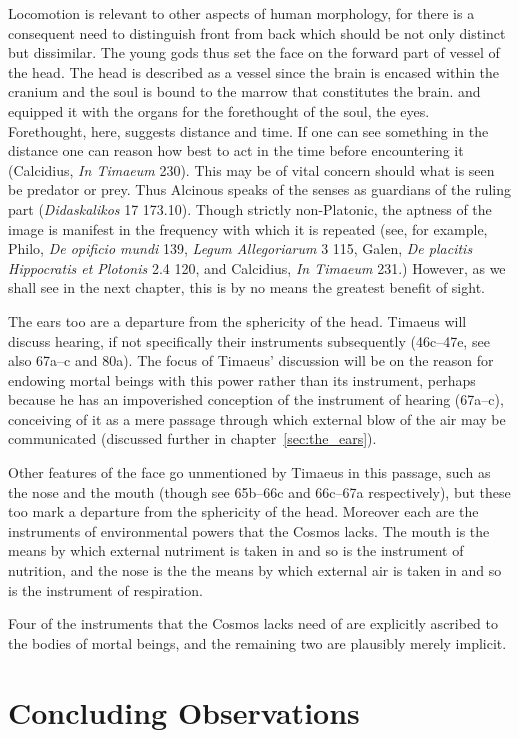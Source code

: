 Locomotion is relevant to other aspects of human morphology, for there is a consequent need to distinguish front from back which should be not only distinct but dissimilar. The young gods thus set the face on the forward part of vessel of the head. The head is described as a vessel since the brain is encased within the cranium and the soul is bound to the marrow that constitutes the brain. and equipped it with the organs for the forethought of the soul, the eyes. Forethought, here, suggests distance and time. If one can see something in the distance one can reason how best to act in the time before encountering it (Calcidius, \emph{In Timaeum} 230). This may be of vital concern should what is seen be predator or prey. Thus Alcinous speaks of the senses as guardians of the ruling part (\emph{Didaskalikos} 17 173.10). Though strictly non-Platonic, the aptness of the image is manifest in the frequency with which it is repeated (see, for example, Philo, \emph{De opificio mundi} 139, \emph{Legum Allegoriarum} 3 115, Galen, \emph{De placitis Hippocratis et Plotonis} 2.4 120, and Calcidius, \emph{In Timaeum} 231.) However, as we shall see in the next chapter, this is by no means the greatest benefit of sight. 

The ears too are a departure from the sphericity of the head. Timaeus will discuss hearing, if not specifically their instruments subsequently (46c–47e, see also 67a--c and 80a). The focus of Timaeus' discussion will be on the reason for endowing mortal beings with this power rather than its instrument, perhaps because he has an impoverished conception of the instrument of hearing (67a--c), conceiving of it as a mere passage through which external blow of the air may be communicated (discussed further in chapter~\ref{sec:the_ears}). 

Other features of the face go unmentioned by Timaeus in this passage, such as the nose and the mouth (though see 65b--66c and 66c--67a respectively), but these too mark a departure from the sphericity of the head. Moreover each are the instruments of environmental powers that the Cosmos lacks. The mouth is the means by which external nutriment is taken in and so is the instrument of nutrition, and the nose is the the means by which external air is taken in and so is the instrument of respiration. 

Four of the instruments that the Cosmos lacks need of are explicitly ascribed to the bodies of mortal beings, and the remaining two are plausibly merely implicit. 



\section{Concluding Observations} %
\label{sec:concluding_observations_incarnation}




